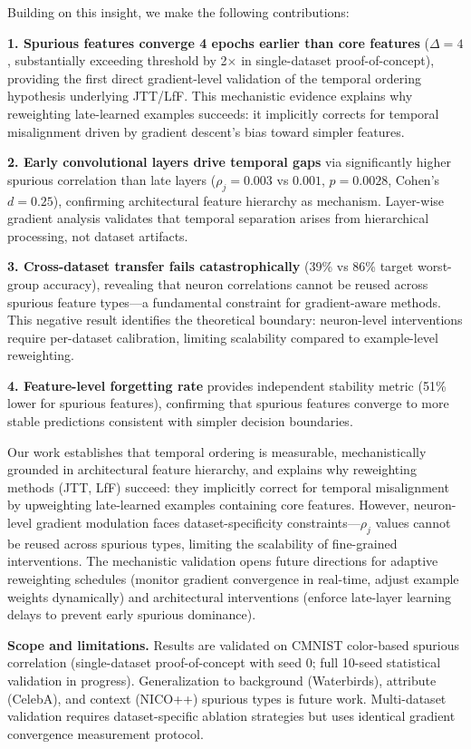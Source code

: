 Building on this insight, we make the following contributions:

\textbf{1. Spurious features converge 4 epochs earlier than core features} ($\Delta=4$, substantially exceeding threshold by 2$\times$ in single-dataset proof-of-concept), providing the first direct gradient-level validation of the temporal ordering hypothesis underlying JTT/LfF. This mechanistic evidence explains why reweighting late-learned examples succeeds: it implicitly corrects for temporal misalignment driven by gradient descent's bias toward simpler features.

\textbf{2. Early convolutional layers drive temporal gaps} via significantly higher spurious correlation than late layers ($\rho_j=0.003$ vs $0.001$, $p=0.0028$, Cohen's $d=0.25$), confirming architectural feature hierarchy as mechanism. Layer-wise gradient analysis validates that temporal separation arises from hierarchical processing, not dataset artifacts.

\textbf{3. Cross-dataset transfer fails catastrophically} (39\% vs 86\% target worst-group accuracy), revealing that neuron correlations cannot be reused across spurious feature types---a fundamental constraint for gradient-aware methods. This negative result identifies the theoretical boundary: neuron-level interventions require per-dataset calibration, limiting scalability compared to example-level reweighting.

\textbf{4. Feature-level forgetting rate} provides independent stability metric (51\% lower for spurious features), confirming that spurious features converge to more stable predictions consistent with simpler decision boundaries.

Our work establishes that temporal ordering is measurable, mechanistically grounded in architectural feature hierarchy, and explains why reweighting methods (JTT, LfF) succeed: they implicitly correct for temporal misalignment by upweighting late-learned examples containing core features. However, neuron-level gradient modulation faces dataset-specificity constraints---$\rho_j$ values cannot be reused across spurious types, limiting the scalability of fine-grained interventions. The mechanistic validation opens future directions for adaptive reweighting schedules (monitor gradient convergence in real-time, adjust example weights dynamically) and architectural interventions (enforce late-layer learning delays to prevent early spurious dominance).

\textbf{Scope and limitations.} Results are validated on CMNIST color-based spurious correlation (single-dataset proof-of-concept with seed 0; full 10-seed statistical validation in progress). Generalization to background (Waterbirds), attribute (CelebA), and context (NICO++) spurious types is future work. Multi-dataset validation requires dataset-specific ablation strategies but uses identical gradient convergence measurement protocol.

